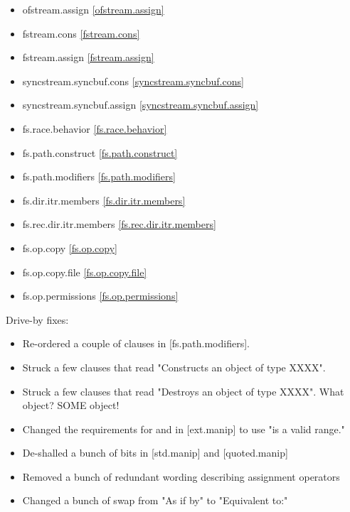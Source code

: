 \begin{multicols}{2}
\begin{itemize}
\item{ofstream.assign}					\ref{ofstream.assign}
\item{fstream.cons}						\ref{fstream.cons}
\item{fstream.assign}					\ref{fstream.assign}
\item{syncstream.syncbuf.cons}			\ref{syncstream.syncbuf.cons}
\item{syncstream.syncbuf.assign}		\ref{syncstream.syncbuf.assign}
\item{fs.race.behavior}					\ref{fs.race.behavior}
\item{fs.path.construct}				\ref{fs.path.construct}
\item{fs.path.modifiers}				\ref{fs.path.modifiers}
\item{fs.dir.itr.members}				\ref{fs.dir.itr.members}
\item{fs.rec.dir.itr.members}			\ref{fs.rec.dir.itr.members}
\item{fs.op.copy}						\ref{fs.op.copy}
\item{fs.op.copy.file}					\ref{fs.op.copy.file}
\item{fs.op.permissions}				\ref{fs.op.permissions}
\end{itemize}
\end{multicols}

Drive-by fixes:
\begin{itemize}
\item{Re-ordered a couple of clauses in [fs.path.modifiers]. }
\item{Struck a few clauses that read "Constructs an object of type XXXX".}
\item{Struck a few clauses that read "Destroys an object of type XXXX". What object? SOME object!}
\item{Changed the requirements for  and  in [ext.manip] to use "is a valid range."}
\item{De-shalled a bunch of bits in [std.manip] and [quoted.manip]}
\item{Removed a bunch of redundant wording describing assignment operators}
\item{Changed a bunch of swap \effects from "As if by" to "Equivalent to:"}
\end{itemize}


